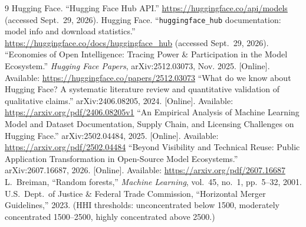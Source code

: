 \documentclass[conference]{IEEEtran}
\begin{document}
\begin{thebibliography}{9}
\footnotesize
{} Hugging Face. ``Hugging Face Hub API.''
\url{https://huggingface.co/api/models} (accessed Sept.~29, 2026).
 Hugging Face. ``\texttt{huggingface\_hub} documentation:
model info and download statistics.''
\url{https://huggingface.co/docs/huggingface_hub} (accessed Sept.~29, 2026).
 ``Economies of Open Intelligence: Tracing Power \&
Participation in the Model Ecosystem.'' \textit{Hugging Face Papers},
arXiv:2512.03073, Nov. 2025. [Online]. Available:
\url{https://huggingface.co/papers/2512.03073}
 ``What do we know about Hugging Face? A systematic
literature review and quantitative validation of qualitative claims.''
arXiv:2406.08205, 2024. [Online]. Available:
\url{https://arxiv.org/pdf/2406.08205v1}
 ``An Empirical Analysis of Machine Learning Model and
Dataset Documentation, Supply Chain, and Licensing Challenges on Hugging
Face.'' arXiv:2502.04484, 2025. [Online]. Available:
\url{https://arxiv.org/pdf/2502.04484}
 ``Beyond Visibility and Technical Reuse: Public Application
Transformation in Open-Source Model Ecosystems.'' arXiv:2607.16687, 2026.
[Online]. Available: \url{https://arxiv.org/pdf/2607.16687}
 L.~Breiman, ``Random forests,'' \textit{Machine Learning},
vol.~45, no.~1, pp.~5--32, 2001.
 U.S.~Dept.~of Justice \& Federal Trade Commission,
``Horizontal Merger Guidelines,'' 2023. (HHI thresholds: unconcentrated below
1500, moderately concentrated 1500--2500, highly concentrated above 2500.)
\end{thebibliography}
\end{document}
